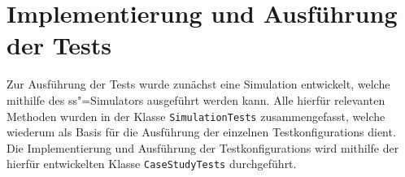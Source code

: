 \chapter{Implementierung und Ausführung der Tests}
\label{ch:testExecution}

Zur Ausführung der \glspl{Test} wurde zunächst eine Simulation entwickelt, welche mithilfe des \gls{ss}"=Simulators ausgeführt werden kann.
Alle hierfür relevanten Methoden wurden in der Klasse \texttt{SimulationTests} zusammengefasst, welche wiederum als Basis für die Ausführung der einzelnen \glspl{Testkonfiguration} dient.
Die Implementierung und Ausführung der \glspl{Testkonfiguration} wird mithilfe der hierfür entwickelten Klasse \texttt{CaseStudyTests} durchgeführt.








